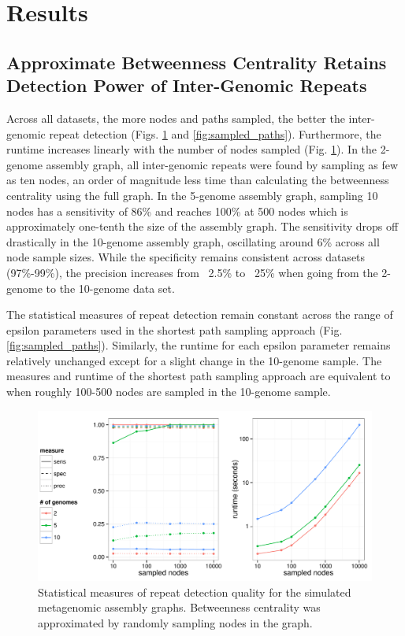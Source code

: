 \documentclass[runningheads,a4paper]{llncs}
\begin{document}
\section{Results} 


\subsection*{Approximate Betweenness Centrality Retains Detection Power of Inter-Genomic Repeats}

Across all datasets, the more nodes and paths sampled, the better the inter-genomic repeat detection (Figs. \ref{fig:sampled_nodes} and \ref{fig:sampled_paths}).
Furthermore, the runtime increases linearly with the number of nodes sampled (Fig. \ref{fig:sampled_nodes}).
In the 2-genome assembly graph, all inter-genomic repeats were found by sampling as few as ten nodes, an order of magnitude less time than calculating the betweenness centrality using the full graph.
In the 5-genome assembly graph, sampling 10 nodes has a sensitivity of 86\% and reaches 100\% at 500 nodes which is approximately one-tenth the size of the assembly graph.
The sensitivity drops off drastically in the 10-genome assembly graph, oscillating around 6\% across all node sample sizes.
While the specificity remains consistent across datasets (97\%-99\%), the precision increases from ~2.5\% to ~25\% when going from the 2-genome to the 10-genome data set.

The statistical measures of repeat detection remain constant across the range of epsilon parameters used in the shortest path sampling approach (Fig. \ref{fig:sampled_paths}).
Similarly, the runtime for each epsilon parameter remains relatively unchanged except for a slight change in the 10-genome sample.
The measures and runtime of the shortest path sampling approach are equivalent to when roughly 100-500 nodes are sampled in the 10-genome sample.

\begin{figure}[htbp]
\centering
\includegraphics[width = \textwidth]{sampled_nodes}
\caption{Statistical measures of repeat detection quality for the simulated metagenomic assembly graphs. Betweenness centrality was approximated by randomly sampling nodes in the graph.}
\label{fig:sampled_nodes}
\end{figure}
\end{document}
